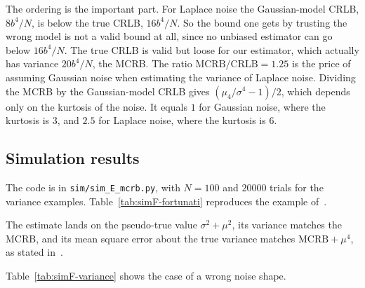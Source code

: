 \documentclass[11pt]{article}
\numberwithin{figure}{section}
\numberwithin{equation}{section}
\begin{document}
The ordering is the important part. For Laplace noise the Gaussian-model CRLB, $8b^4/N$, is below
the true CRLB, $16b^4/N$. So the bound one gets by trusting the wrong model is not a valid bound at
all, since no unbiased estimator can go below $16b^4/N$. The true CRLB is valid but loose for our
estimator, which actually has variance $20b^4/N$, the MCRB. The ratio $\text{MCRB}/\text{CRLB} = 1.25$
is the price of assuming Gaussian noise when estimating the variance of Laplace noise. Dividing the
MCRB by the Gaussian-model CRLB gives $(\mu_4/\sigma^4 - 1)/2$, which depends only on the kurtosis of
the noise. It equals $1$ for Gaussian noise, where the kurtosis is $3$, and $2.5$ for Laplace noise,
where the kurtosis is $6$.

\subsection{Simulation results}

The code is in \texttt{sim/sim\_E\_mcrb.py}, with $N = 100$ and $20000$ trials for the variance
examples. Table~\ref{tab:simF-fortunati} reproduces the example of~\cite[Section~4.2]{fortunati}.

\begin{table}[H]
\centering
{}
\caption{The variance example of Fortunati et al.~\cite[Section~4.2]{fortunati}, with $\sigma = 1$,
$N = 100$, $20000$ trials. The MSE is measured about the true variance $\sigma^2 = 1$.}
\label{tab:simF-fortunati}
\end{table}

The estimate lands on the pseudo-true value $\sigma^2 + \mu^2$, its variance matches the MCRB, and its
mean square error about the true variance matches $\text{MCRB} + \mu^4$, as stated in~\cite{fortunati}.

Table~\ref{tab:simF-variance} shows the case of a wrong noise shape.
\end{document}
